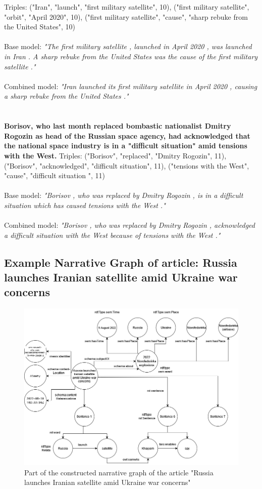 \documentclass[
hf, %
]{ceurart}
\begin{document}
\noindent
Triples: ("Iran", "launch", "first military satellite", 10), ("first military satellite", "orbit", "April 2020", 10), ("first military satellite", "cause", "sharp rebuke from the United States", 10)\\\\
\noindent
Base model: \textit{"The first military satellite , launched in April 2020 , was launched in Iran . A sharp rebuke from the United States was the cause of the first military satellite ."}\\\\
\noindent
Combined model: \textit{"Iran launched its first military satellite in April 2020 , causing a sharp rebuke from the United States ."}\\\\\\
\noindent
\textbf{Borisov, who last month replaced bombastic nationalist Dmitry Rogozin as head of the Russian space agency, had acknowledged that the national space industry is in a "difficult situation" amid tensions with the West.}
\noindent
Triples: ("Borisov", "replaced", "Dmitry Rogozin", 11), ("Borisov", "acknowledged", "difficult situation", 11), ("tensions with the West", "cause", "difficult situation ", 11)\\\\
\noindent
Base model: \textit{"Borisov , who was replaced by Dmitry Rogozin , is in a difficult situation which has caused tensions with the West ."}\\\\
\noindent
Combined model: \textit{"Borisov , who was replaced by Dmitry Rogozin , acknowledged a difficult situation with the West because of tensions with the West ."}

\subsection{Example Narrative Graph of article: Russia launches Iranian satellite amid Ukraine war concerns}
\begin{figure}
    \includegraphics[scale=0.45]{Images/NG_article.png}
\caption{Part of the constructed narrative graph of the article "Russia launches Iranian satellite amid Ukraine war concerns"}
\label{fig:NG_article}
\end{figure}
\clearpage
\end{document}
